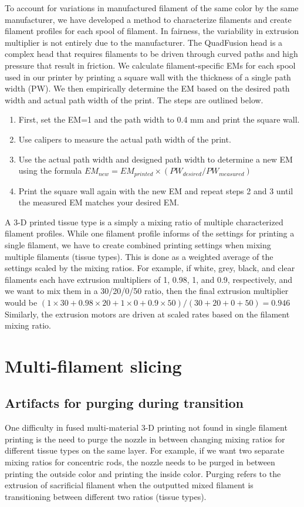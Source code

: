 To account for variations in manufactured filament of the same color by the same manufacturer, we have developed a method to characterize filaments and create filament profiles for each spool of filament. In fairness, the variability in extrusion multiplier is not entirely due to the manufacturer. The QuadFusion head is a complex head that requires filaments to be driven through curved paths and high pressure that result in friction. We calculate filament-specific EMs for each spool used in our printer by printing a square wall with the thickness of a single path width (PW). We then empirically determine the EM based on the desired path width and actual path width of the print. The steps are outlined below. 
\begin{enumerate}
    \item First, set the EM=1 and the path width to 0.4 mm and print the square wall.
    \item Use calipers to measure the actual path width of the print.
    \item Use the actual path width and designed path width to determine a new EM using the formula $EM_{new} = EM_{printed} \times (PW_{desired}/PW_{measured})$
    \item Print the square wall again with the new EM and repeat steps 2 and 3 until the measured EM matches your desired EM. 
\end{enumerate}

A 3-D printed tissue type is a simply a mixing ratio of multiple characterized filament profiles. While one filament profile informs of the settings for printing a single filament, we have to create combined printing settings when mixing multiple filaments (tissue types). This is done as a weighted average of the settings scaled by the mixing ratios. For example, if white, grey, black, and clear filaments each have extrusion multipliers of 1, 0.98, 1, and 0.9, respectively, and we want to mix them in a 30/20/0/50 ratio, then the final extrusion multiplier would be
$(1\times30 + 0.98\times20 + 1\times0 + 0.9\times50) / (30+20+0+50) = 0.946$ Similarly, the extrusion motors are driven at scaled rates based on the filament mixing ratio.



\section{Multi-filament slicing}
\subsection{Artifacts for purging during transition}
One difficulty in fused multi-material 3-D printing not found in single filament printing is the need to purge the nozzle in between changing mixing ratios for different tissue types on the same layer. For example, if we want two separate mixing ratios for concentric rods, the nozzle needs to be purged in between printing the outside color and printing the inside color. Purging refers to the extrusion of sacrificial filament when the outputted mixed filament is transitioning between different two ratios (tissue types).

